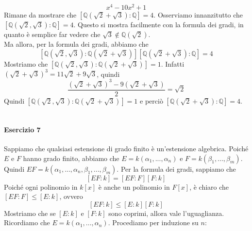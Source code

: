 \documentclass[12pt,a4paper]{report}
\theoremstyle{definition}
\begin{document}
$$x^4-10x^2+1$$
Rimane da mostrare che $[\mathbb{Q}(\sqrt{2}+\sqrt{3}):\mathbb{Q}]=4$.
Osserviamo innanzitutto che $[\mathbb{Q}(\sqrt{2},\sqrt{3}):\mathbb{Q}]=4$. Questo si mostra facilmente con la formula dei gradi, in quanto è semplice far vedere che $\sqrt{3} \not\in \mathbb{Q}(\sqrt{2})$.\\
Ma allora, per la formula dei gradi, abbiamo che
$$[\mathbb{Q}(\sqrt{2},\sqrt{3}):\mathbb{Q}(\sqrt{2}+\sqrt{3})] [\mathbb{Q}(\sqrt{2}+\sqrt{3}):\mathbb{Q}]=4$$
Mostriamo che $[\mathbb{Q}(\sqrt{2},\sqrt{3}):\mathbb{Q}(\sqrt{2}+\sqrt{3})]=1$. Infatti $(\sqrt{2}+\sqrt{3})^3=11\sqrt{2}+9\sqrt{3}$, quindi 
$$\frac{(\sqrt{2}+\sqrt{3})^3-9(\sqrt{2}+\sqrt{3})}{2}=\sqrt{2}$$
Quindi $[\mathbb{Q}(\sqrt{2},\sqrt{3}):\mathbb{Q}(\sqrt{2}+\sqrt{3})]=1$ e perciò $[\mathbb{Q}(\sqrt{2}+\sqrt{3}):\mathbb{Q}]=4$.
\\
\\
\\
\noindent\textbf{Esercizio 7}\\
\\
Sappiamo che qualsiasi estensione di grado finito è un'estensione algebrica. Poiché $E$ e $F$ hanno grado finito, abbiamo che $E=k(\alpha_1,...,\alpha_n)$ e $F=k(\beta_1,...,\beta_m)$. Quindi $EF=k(\alpha_1,...,\alpha_n,\beta_1,...,\beta_m)$. Per la formula dei gradi, sappiamo che
$$[EF:k]=[EF:F][F:k]$$
Poiché ogni polinomio in $k[x]$ è anche un polinomio in $F[x]$, è chiaro che $[EF:F] \leq [E:k]$, ovvero
$$[EF:k] \leq [E:k][F:k]$$
Mostriamo che se $[E:k]$ e $[F:k]$ sono coprimi, allora vale l'uguaglianza. Ricordiamo che $E=k(\alpha_1,...,\alpha_n)$.  Procediamo per induzione su $n$:
\end{document}
